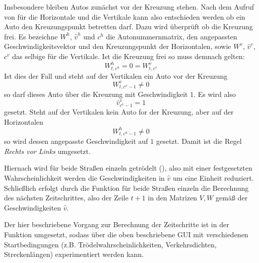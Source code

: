 Insbesondere bleiben Autos zunächst vor der Kreuzung stehen. Nach dem Aufruf von  für die
Horizontale und die Vertikale kann also entschieden werden ob ein Auto den Kreuzungspunkt betretten darf. 
Dazu wird überprüft ob die Kreuzung frei. Es bezeichne \(W^h\), \(\hat{v}^h\) und \(c^h\) 
die Autonummernmatrix, den angepassten Geschwindigkeitsvektor und den Kreuzungspunkt der Horizontalen, sowie
\(W^v\), \(\hat{v}^v\), \(c^v\) das selbige für die Vertikale. Ist die Kreuzung frei so muss demnach gelten: 
\[W^h_{t,c^h} = 0 = W^v_{t,c^v}\] 
Ist dies der Fall und steht auf der Vertikalen
ein Auto vor der Kreuzung 
\[W^v_{t,c^v-1} \neq 0\] so darf dieses Auto über die Kreuzung mit Geschwindigkeit \(1\). 
Es wird also 
\[\hat{v}^v_{c^v-1} = 1\] 
gesetzt. Steht auf der Vertikalen kein Auto for der Kreuzung, 
aber auf der Horizontalen 
\[W^h_{t,c^h-1} \neq 0\]
so wird dessen angepasste Geschwindigkeit auf \(1\) gesetzt. 
Damit ist die Regel \textit{Rechts vor Links} umgesetzt.

Hiernach wird für beide Straßen einzeln getrödelt (), also mit einer festgesetzten Wahrscheinlichkeit werden
die Geschwindigkeiten in \(\hat{v}\) um eine Einheit reduziert. 
Schließlich erfolgt durch die Funktion  für beide Straßen einzeln die Berechnung des nächsten Zeitschrittes, 
also der Zeile \(t+1\) in den Matrizen \(V,W\) gemäß der Geschwindigkeiten \(\hat{v}\).

Der hier beschriebene Vorgang zur Berechnung der Zeitschritte ist in der Funktion  umgesetzt, 
sodass über die oben beschriebene GUI mit verschiedenen Startbedingungen (z.B. Trödelwahrscheinlichkeiten, Verkehrsdichten, Streckenlängen) experimentiert werden kann.


